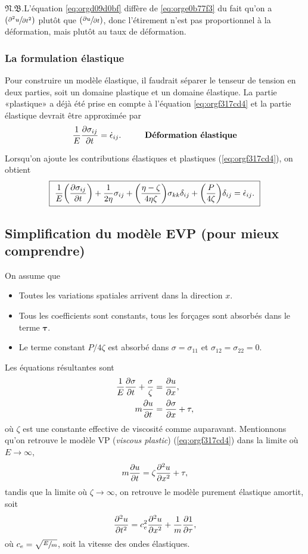 \documentclass[10pt]{article}
\numberwithin{equation}{section}
\newcommand{\pt}{\hspace{1pt}} %
\newcommand{\nb}{\underline{{\footnotesize\EightStarConvex}\pt $\mathfrak{N.B.}$\vphantom{p}}\hspace{3pt}}
\begin{document}
\nb L'équation \ref{eq:orgd09d0bf} diffère de \ref{eq:orge0b77f3} du fait qu'on a \(\qty(\sfrac{\partial^2 u}{\partial t^2})\) plutôt que \(\qty(\sfrac{\partial u}{\partial t})\), donc l'étirement n'est pas proportionnel à la déformation, mais plutôt au taux de déformation.
\subsubsection{La formulation élastique}
\label{sec:org11b6cf3}
Pour construire un modèle élastique, il faudrait séparer le tenseur de tension en deux parties, soit un domaine plastique et un domaine élastique.
La partie «plastique» a déjà été prise en compte à l'équation \ref{eq:orgf317cd4} et la partie élastique devrait être approximée par
\begin{equation}
   \frac{1}{E} \pdv{\sigma_{ij}}{t} = \dot{\epsilon}_{ij}. \hspace{1cm} \text{\textbf{Déformation élastique}}
\end{equation}

Lorsqu'on ajoute les contributions élastiques et plastiques (\ref{eq:orgf317cd4}), on obtient
\begin{equation}
\label{eq:org4919464}
   \boxed{\ \frac{1}{E} \qty(\pdv{\sigma_{ij}}{t}) + \frac{1}{2\eta}\sigma_{ij} + \qty(\frac{\eta - \zeta}{4\eta\zeta}) \sigma_{kk} \delta_{ij} + \qty(\frac{P}{4\zeta}) \delta_{ij} = \dot{\epsilon}_{ij}.\ }
\end{equation}
\subsection{Simplification du modèle EVP (pour mieux comprendre)}
\label{sec:orgd83b7e5}
On assume que
\begin{itemize}
\item Toutes les variations spatiales arrivent dans la direction \(x\).
\item Tous les coefficients sont constants, tous les forçages sont absorbés dans le terme \(\boldsymbol{\tau}\).
\item Le terme constant \(P/4\zeta\) est absorbé dans \(\sigma = \sigma_{11}\) et \(\sigma_{12}=\sigma_{22} = 0\).
\end{itemize}

Les équations résultantes sont
\begin{align}
   \frac{1}{E}\pdv{\sigma}{t} + \frac{\sigma}{\zeta} &= \pdv{u}{x}, \\
   m\pdv{u}{t} &= \pdv{\sigma}{x} + \tau,
\end{align}
où \(\zeta\) est une constante effective de viscosité comme auparavant.
Mentionnons qu'on retrouve le modèle VP (\emph{viscous plastic}) (\ref{eq:orgf317cd4}) dans la limite où \(E\rightarrow\infty\),
\begin{equation}
   m\pdv{u}{t} = \zeta\pdv[2]{u}{x} + \tau,
\end{equation}
tandis que la limite où \(\zeta\rightarrow\infty\), on retrouve le modèle purement élastique amortit, soit
\begin{equation}
   \pdv[2]{u}{t} = c_e^2\pdv[2]{u}{x} + \frac{1}{m}\pdv{1}{\tau},
\end{equation}
où \(c_e = \sqrt{\sfrac{E}{m}}\), soit la vitesse des ondes élastiques. 
\end{document}
